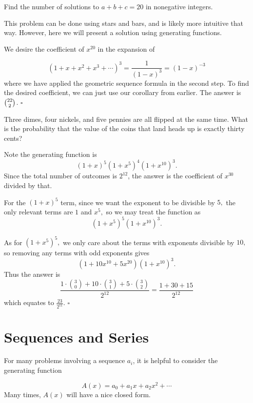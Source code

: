 \documentclass{article}
\begin{document}
\begin{exam}
Find the number of solutions to $a+b+c=20$ in nonegative integers.
\end{exam}

\begin{sol}
This problem can be done using stars and bars, and is likely more intuitive that way. However, here we will present a solution using generating functions.

We desire the coefficient of $x^{20}$ in the expansion of

\[(1+x+x^2+x^3+\cdots)^{3} = \frac{1}{(1-x)^3} = (1-x)^{-3}\]
where we have applied the geometric sequence formula in the second step. To find the desired coefficient, we can just use our corollary from earlier. The answer is $\tbinom{22}{2}$. $\square$
\end{sol}

\begin{exam}
Three dimes, four nickels, and five pennies are all flipped at the same time. What is the probability that the value of the coins that land heads up is exactly thirty cents?
\end{exam}

\begin{sol}
Note the generating function is 
\[(1+x)^5(1+x^5)^4(1+x^{10})^3.\] 
Since the total number of outcomes is $2^{12}$, the answer is the coefficient of $x^{30}$ divided by that.

For the $(1+x)^5$ term, since we want the exponent to be divisible by $5,$ the only relevant terms are $1$ and $x^5,$ so we may treat the function as 
\[(1+x^5)^5(1+x^{10})^3.\] 

As for $(1+x^5)^5,$ we only care about the terms with exponents divisible by $10,$ so removing any terms with odd exponents gives 
\[(1+10x^{10}+5x^{20})(1+x^{10})^3.\] 
Thus the answer is
\[\frac{1\cdot\binom{3}{0}+10\cdot \binom{3}{1}+5\cdot\binom{3}{2}}{2^{12}}=\frac{1+30+15}{2^{12}}\]
which equates to $\frac{23}{2^{11}}$. $\square$
\end{sol}

\section{Sequences and Series}
For many problems involving a sequence $a_i$, it is helpful to consider the generating function

\[A(x) = a_0 + a_1x + a_2x^2 + \cdots\]
Many times, $A(x)$ will have a nice closed form.
\end{document}
